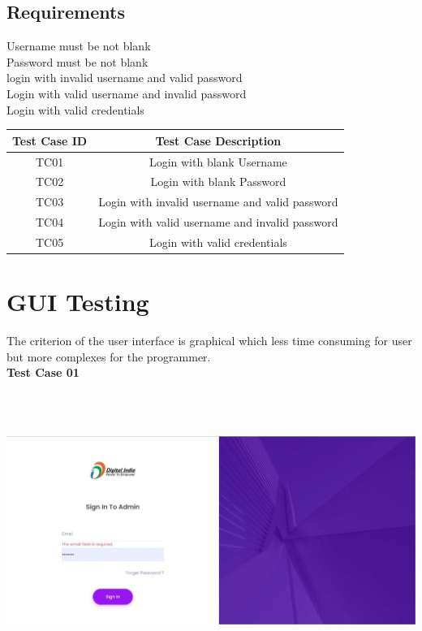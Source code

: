 \subsection{Requirements}
\textbullet \hspace{0.2cm} Username must be not blank \\
\textbullet \hspace{0.2cm} Password must be not blank \\
\textbullet \hspace{0.2cm} login with invalid username and valid password\\
\textbullet \hspace{0.2cm} Login with valid username and invalid password\\
\textbullet \hspace{0.2cm} Login with valid credentials \\


\begin{table}[hp]
\centering
\begin{tabular}{|c|c|}
\hline
\textbf{Test Case ID}  & \textbf{Test Case Description} \\
\hline
TC01 &	Login with blank Username \\\hline
TC02 &	Login with blank Password\\\hline
TC03 &	Login with invalid username and valid password \\\hline
TC04 &	Login with valid username and invalid password\\\hline
TC05 &	Login with valid credentials \\\hline

\end{tabular}
\end{table}


\section{GUI Testing}
The criterion of the user interface is graphical which less time consuming for user but more complexes for the programmer.\\

\pagebreak
\textbf{Test Case 01}
\begin{center}
\includegraphics[height=9cm,width=14cm]{Admin/TC01}
\end{center}

